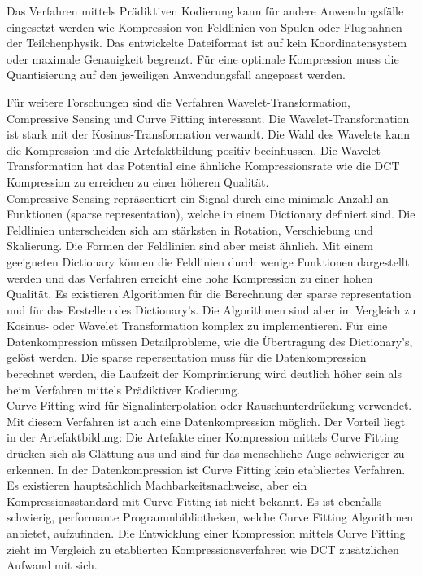 Das Verfahren mittels Prädiktiven Kodierung kann für andere Anwendungsfälle eingesetzt werden wie Kompression von Feldlinien von Spulen oder Flugbahnen der Teilchenphysik. Das entwickelte Dateiformat ist auf kein Koordinatensystem oder maximale Genauigkeit begrenzt. Für eine optimale Kompression muss die Quantisierung auf den jeweiligen Anwendungsfall angepasst werden.

Für weitere Forschungen sind die Verfahren Wavelet-Transformation, Compressive Sensing und Curve Fitting interessant. Die Wavelet-Transformation ist stark mit der Kosinus-Transformation verwandt. Die Wahl des Wavelets kann die Kompression und die Artefaktbildung positiv beeinflussen. Die Wavelet-Transformation hat das Potential eine ähnliche Kompressionsrate wie die DCT Kompression zu erreichen zu einer höheren Qualität.\\
Compressive Sensing repräsentiert ein Signal durch eine minimale Anzahl an Funktionen (sparse representation), welche in einem Dictionary definiert sind. Die Feldlinien unterscheiden sich am stärksten in Rotation, Verschiebung und Skalierung. Die Formen der Feldlinien sind aber meist ähnlich. Mit einem geeigneten Dictionary können die Feldlinien durch wenige Funktionen dargestellt werden und das Verfahren erreicht eine hohe Kompression zu einer hohen Qualität. Es existieren Algorithmen für die Berechnung der sparse representation und für das Erstellen des Dictionary's. Die Algorithmen sind aber im Vergleich zu Kosinus- oder Wavelet Transformation komplex zu implementieren. Für eine Datenkompression müssen Detailprobleme, wie die Übertragung des Dictionary's, gelöst werden. Die sparse repersentation muss für die Datenkompression berechnet werden, die Laufzeit der Komprimierung wird deutlich höher sein als beim Verfahren mittels Prädiktiver Kodierung.\\
Curve Fitting wird für Signalinterpolation oder Rauschunterdrückung verwendet. Mit diesem Verfahren ist auch eine Datenkompression möglich. Der Vorteil liegt in der Artefaktbildung: Die Artefakte einer Kompression mittels Curve Fitting drücken sich als Glättung aus und sind für das menschliche Auge schwieriger zu erkennen. In der Datenkompression ist Curve Fitting kein etabliertes Verfahren. Es existieren hauptsächlich Machbarkeitsnachweise, aber ein Kompressionsstandard mit Curve Fitting ist nicht bekannt. Es ist ebenfalls schwierig, performante Programmbibliotheken, welche Curve Fitting Algorithmen anbietet, aufzufinden. Die Entwicklung einer Kompression mittels Curve Fitting zieht im Vergleich zu etablierten Kompressionsverfahren wie DCT zusätzlichen Aufwand mit sich.